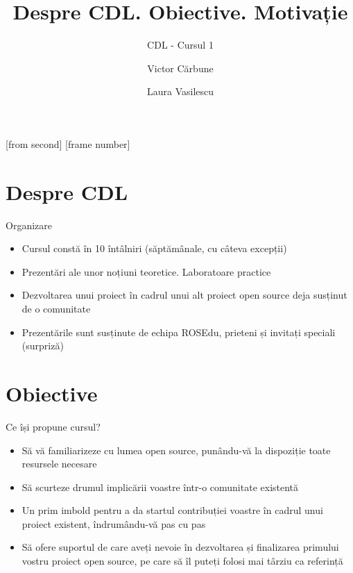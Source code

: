 \documentclass{beamer}
\title{Despre CDL. Obiective. Motivație}
\subtitle{CDL - Cursul 1}
\institute[ROSEdu]{ROSEdu}
\author[Victor]{Victor Cărbune \and Laura Vasilescu}
\begin{document}
[from second]
[frame number]

\frame{\titlepage}

\begin{frame}
\tableofcontents
\end{frame}

\section{Despre CDL}


\begin{frame}{Organizare}
  \begin{itemize} %
  \pause
  \item Cursul constă în 10 întâlniri (săptămânale, cu câteva excepții)
  \pause
  \item Prezentări ale unor noțiuni teoretice. Laboratoare practice
  \pause
  \item Dezvoltarea unui proiect în cadrul unui alt proiect open source deja susținut de o comunitate 
  \pause
  \item Prezentările sunt susținute de echipa ROSEdu, prieteni și invitați speciali (surpriză)
  \end{itemize}
\end{frame}

\section{Obiective}

\begin{frame}{Ce își propune cursul?}
  \begin{itemize} %
  \pause
  \item Să vă familiarizeze cu lumea open source, punându-vă la dispoziție toate resursele necesare
  \pause
  \item Să scurteze drumul implicării voastre într-o comunitate existentă 
  \pause
  \item Un prim imbold pentru a da startul contribuției voastre în cadrul unui proiect existent, îndrumându-vă pas cu pas
  \pause
  \item Să ofere suportul de care aveți nevoie în dezvoltarea și finalizarea primului vostru proiect open source, pe care să îl puteți folosi mai târziu ca referință
  \end{itemize}
\end{frame}
\end{document}
